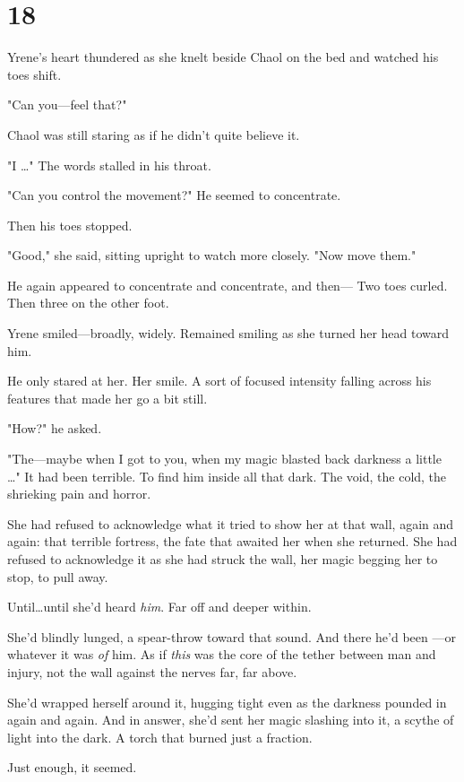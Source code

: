 
\chapter{18}

Yrene's heart thundered as she knelt beside Chaol on the bed and watched his toes shift.

"Can you---feel that?"

Chaol was still staring as if he didn't quite believe it.

"I \ldots" The words stalled in his throat.

"Can you control the movement?"
He seemed to concentrate.

Then his toes stopped.

"Good," she said, sitting upright to watch more closely.
"Now move them."

He again appeared to concentrate and concentrate, and then--- Two toes curled.
Then three on the other foot.

Yrene smiled---broadly, widely.
Remained smiling as she turned her head toward him.

He only stared at her.
Her smile.
A sort of focused intensity falling across his features that made her go a bit still.

"How?"
he asked.

"The---maybe when I got to you, when my magic blasted back darkness a little \ldots" It had been terrible.
To find him inside all that dark.
The void, the cold, the shrieking pain and horror.

She had refused to acknowledge what it tried to show her at that wall, again and again: that terrible fortress, the fate that awaited her when she returned.
She had refused to acknowledge it as she had struck the wall, her magic begging her to stop, to pull away.

Until\ldots until she'd heard \emph{him}.
Far off and deeper within.

She'd blindly lunged, a spear-throw toward that sound.
And there he'd been ---or whatever it was \emph{of} him.
As if \emph{this} was the core of the tether between man and injury, not the wall against the nerves far, far above.

She'd wrapped herself around it, hugging tight even as the darkness pounded in again and again.
And in answer, she'd sent her magic slashing into it, a scythe of light into the dark.
A torch that burned just a fraction.

Just enough, it seemed.

